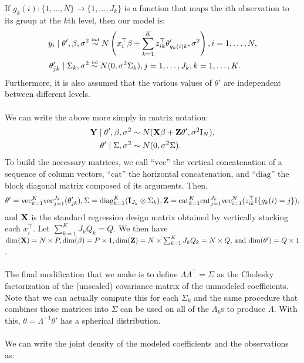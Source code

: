 \documentclass[10pt]{article}
\begin{document}
If \(g_k(i) : \{1,\ldots,N\} \rightarrow \{1,\ldots,J_k\}\) is a
function that maps the $i$th observation to its group at the $k$th
level, then our model is:
\begin{align*}
y_i \mid \theta', \beta, \sigma^2 & \overset{\text{\tiny ind}}{\sim}
N\left(x_i^\top\beta + \sum_{k=1}^K z_{ik}^\top\theta_{g_k(i)k}', \sigma^2\right), i=1,\ldots,N, \\
\theta_{jk}' \mid \Sigma_k, \sigma^2 & \overset{\text{\tiny iid}}{\sim}
N(0, \sigma^2\Sigma_k), j=1,\ldots,J_k, k=1,\ldots,K.
\end{align*}
Furthermore, it is also assumed that the various values of $\theta'$
are independent between different levels. \\ \\
We can write the above more simply in matrix notation:
\begin{align*}
{\bf Y} \mid \theta', \beta, \sigma^2 & \sim
N({\bf X}\beta + {\bf Z}\theta', \sigma^2 \mathrm{I}_N), \\
\theta' \mid \Sigma, \sigma^2 & \sim N(0, \sigma^2 \Sigma).
\end{align*} 
To build the necessary matrices, we call ``\(\mathrm{vec}\)'' the vertical concatenation of a sequence of
column vectors, ``\(\mathrm{cat}\)'' the horizontal
concatenation, and ``\(\mathrm{diag}\)'' the block diagonal matrix
composed of its arguments. Then,
\begin{equation*}
\theta' = \mathrm{vec}_{k=1}^K\mathrm{vec}_{j=1}^{J_k}(\theta_{jk}'),
\Sigma=\mathrm{diag}_{k=1}^K({\bf I}_{J_k} \otimes \Sigma_k),
{\bf Z}=\mathrm{cat}_{k=1}^K\mathrm{cat}_{j=1}^{J_k}\mathrm{vec}_{i=1}^N
(z_{ik}^\top\mathbb{I}\{g_k(i)=j\}),
\end{equation*}
and ${\bf X}$ is the standard regression design matrix obtained by
vertically stacking each $x_i^\top$. Let $\sum_{k=1}^K J_k Q_k =
Q$. We then have
$\mathrm{dim}({\bf X}) = N\times P,
\mathrm{dim}(\beta) = P \times 1,
\mathrm{dim}({\bf Z})=N\times\sum_{k=1}^K J_k Q_k = N \times Q,\) and \(
\mathrm{dim}(\theta') = Q \times 1$. \\ \\
The final modification that we make is to define $\Lambda\Lambda^\top
= \Sigma$ as the Cholesky factorization of the (unscaled) covariance matrix of the
unmodeled coefficients. Note that we can actually compute this for
each $\Sigma_k$ and the same procedure that combines those matrices
into $\Sigma$ can be used on all of the $\Lambda_k$s to produce
$\Lambda$. With this, $\theta=\Lambda^{-1}\theta'$ has a spherical
distribution. \\ \\
We can write the joint density of the modeled coefficients and the
observations as:
\end{document}
